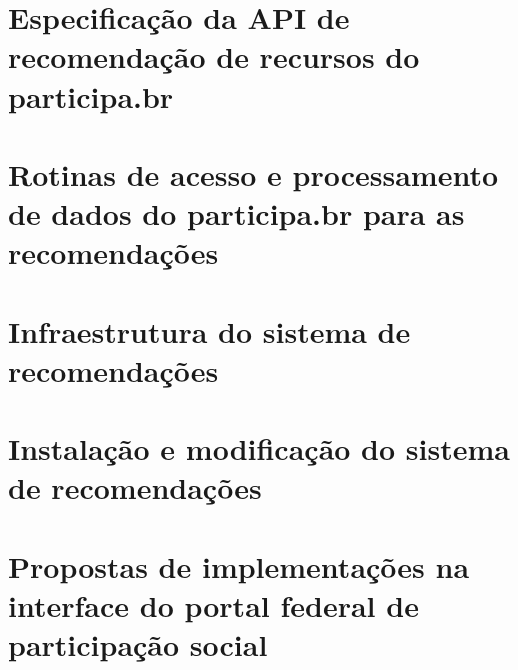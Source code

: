 \documentclass[12pt]{article}
\begin{document}
\section{Especificação da API de recomendação de recursos do participa.br}\label{sec:api}
\section{Rotinas de acesso e processamento de dados do participa.br para as recomendações}\label{sec:algs}
\section{Infraestrutura do sistema de recomendações}
\section{Instalação e modificação do sistema de recomendações}
\section{Propostas de implementações na interface do portal federal de participação social}\label{sec:acr}
\end{document}
